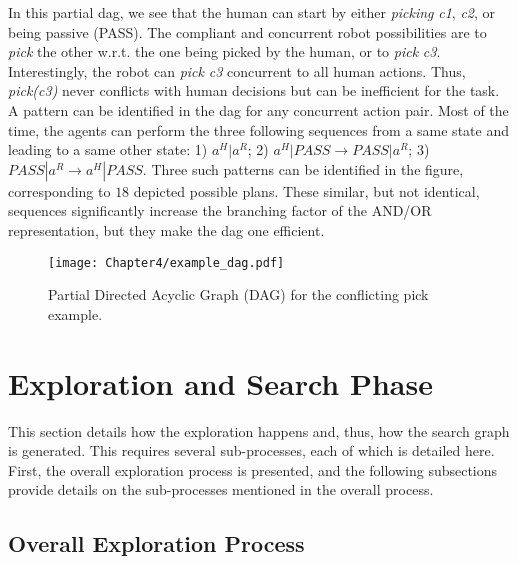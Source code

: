 In this partial \acrshort{dag}, we see that the human can start by either \textit{picking} \textit{c1}, \textit{c2}, or being passive (PASS). The compliant and concurrent robot possibilities are to \textit{pick} the other w.r.t. the one being picked by the human, or to \textit{pick} \textit{c3}. Interestingly, the robot can \textit{pick} \textit{c3} concurrent to all human actions. Thus, \textit{pick(c3)} never conflicts with human decisions but can be inefficient for the task. A pattern can be identified in the \acrshort{dag} for any concurrent action pair. Most of the time, the agents can perform the three following sequences from a same state and leading to a same other state: 1) $a^H|a^R$; 2) $a^H|PASS \rightarrow PASS|a^R$; 3) $PASS|a^R \rightarrow a^H|PASS$. Three such patterns can be identified in the figure, corresponding to $18$ depicted possible plans. These similar, but not identical, sequences significantly increase the branching factor of the AND/OR representation, but they make the \acrshort{dag} one efficient. 

\begin{sidewaysfigure}
    \texttt{[image: Chapter4/example\_dag.pdf]}
    \caption{Partial Directed Acyclic Graph (DAG) for the conflicting pick example.}
    \label{fig:example_partial_dag}
\end{sidewaysfigure}

\clearpage

\section{Exploration and Search Phase}

This section details how the exploration happens and, thus, how the search graph is generated. This requires several sub-processes, each of which is detailed here. First, the overall exploration process is presented, and the following subsections provide details on the sub-processes mentioned in the overall process.

    \subsection*{Overall Exploration Process}


